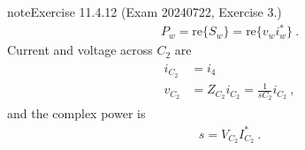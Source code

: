 \documentclass[letterpaper,10pt,english]{jupyterBook}
\begin{document}
\begin{sphinxadmonition}{note}{Exercise 11.4.12 (Exam 2024\sphinxhyphen{}07\sphinxhyphen{}22, Exercise 3.)}
\begin{equation*}
\begin{split}P_w = \text{re} \{ S_w \} = \text{re} \{ v_w i_w^* \} \ .\end{split}
\end{equation*}
\sphinxAtStartPar
{} Current and voltage across \(C_2\) are
\begin{equation*}
\begin{split}\begin{aligned}
  i_{C_2} & = i_4 \\
  v_{C_2} & = Z_{C_2} i_{C_2} = \frac{1}{s C_2} i_{C_2} \ ,
\end{aligned}\end{split}
\end{equation*}
\sphinxAtStartPar
and the complex power is
\begin{equation*}
\begin{split}s = V_{C_2} I_{C_2}^* \ .\end{split}
\end{equation*}\end{sphinxadmonition}
 \label{exercise:exam-24-06-19-exe-01}
\end{document}
